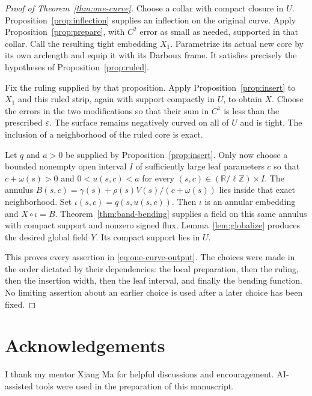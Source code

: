 \documentclass[11pt]{amsart}
\theoremstyle{definition}
\newcommand{\R}{\mathbb R}
\begin{document}
\begin{proof}[Proof of Theorem~\ref{thm:one-curve}]
Choose a collar with compact closure in $U$.
Proposition~\ref{prop:inflection} supplies an inflection on the
original curve. Apply Proposition~\ref{prop:prepare}, with
$C^2$ error as small as needed, supported in that collar.
Call the resulting tight embedding $X_1$.
Parametrize its actual new core by its own arclength and equip
it with its Darboux frame. It satisfies precisely the hypotheses
of Proposition~\ref{prop:ruled}.

Fix the ruling supplied by that proposition.
Apply Proposition~\ref{prop:insert} to $X_1$ and this ruled strip,
again with support compactly in $U$, to obtain $X$.
Choose the errors in the two modifications so that their sum
in $C^1$ is less than the prescribed $\varepsilon$.
The surface remains negatively curved on all of $U$ and is tight.
The inclusion of a neighborhood of the ruled core is exact.

Let $q$ and $a>0$ be supplied by Proposition~\ref{prop:insert}.
Only now choose a bounded nonempty open interval $I$ of sufficiently
large leaf parameters $c$ so that $c+\omega(s)>0$ and
$0<u(s,c)<a$ for every $(s,c)\in(\R/\ell\mathbb Z)\times I$.
The annulus
$B(s,c)=\gamma(s)+\rho(s)V(s)/(c+\omega(s))$
lies inside that exact neighborhood.
Set $\iota(s,c)=q(s,u(s,c))$.
Then $\iota$ is an annular embedding and
$X\circ\iota=B$. Theorem~\ref{thm:band-bending} supplies a field
on this same annulus with compact support and nonzero signed
flux. Lemma~\ref{lem:globalize} produces the desired global
field $Y$. Its compact support lies in $U$.

This proves every assertion in \eqref{eq:one-curve-output}.
The choices were made in the order dictated by their dependencies:
the local preparation, then the ruling, then the insertion width,
then the leaf interval, and finally the bending function.
No limiting assertion about an earlier choice is used after a
later choice has been fixed.
\end{proof}

\section*{Acknowledgements}
I thank my mentor Xiang Ma for helpful discussions and encouragement.
AI-assisted tools were used in the preparation of this manuscript.
\end{document}
